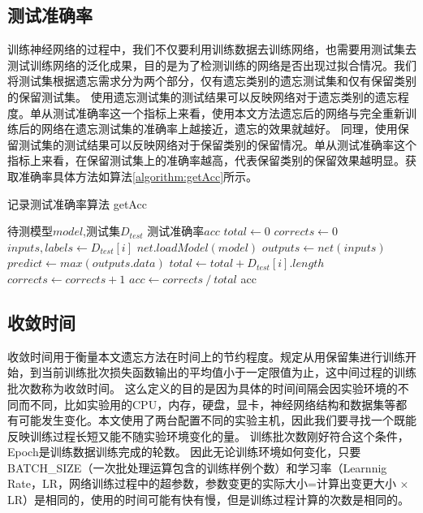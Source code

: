 \subsection{测试准确率}
训练神经网络的过程中，我们不仅要利用训练数据去训练网络，也需要用测试集去测试训练网络的泛化成果，目的是为了检测训练的网络是否出现过拟合情况。我们将测试集根据遗忘需求分为两个部分，仅有遗忘类别的遗忘测试集和仅有保留类别的保留测试集。
使用遗忘测试集的测试结果可以反映网络对于遗忘类别的遗忘程度。单从测试准确率这一个指标上来看，使用本文方法遗忘后的网络与完全重新训练后的网络在遗忘测试集的准确率上越接近，遗忘的效果就越好。
同理，使用保留测试集的测试结果可以反映网络对于保留类别的保留情况。单从测试准确率这个指标上来看，在保留测试集上的准确率越高，代表保留类别的保留效果越明显。获取准确率具体方法如算法\ref{algorithm:getAcc}所示。
\begin{algorithm}
	\renewcommand{\algorithmicrequire}{\textbf{Input:}}
	\renewcommand{\algorithmicensure}{\textbf{Output:}}
	\caption{记录测试准确率算法  getAcc}
	\label{algorithm:getAcc}
	\begin{algorithmic}[1]
        \REQUIRE 待测模型$model$,测试集$D_{test}$
        \ENSURE  测试准确率$acc$
        \STATE $total \gets 0$
        \STATE $corrects \gets 0$
            \STATE $inputs, labels \gets D_{test}[i]$
            \STATE $net.loadModel(model)$
            \STATE $outputs \gets net(inputs)$
            \STATE $predict \gets max(outputs.data)$
            \STATE $total \gets total + D_{test}[i].length$
                    \STATE $corrects \gets corrects + 1$
                \ENDIF
            \ENDFOR
        \ENDFOR
        \STATE $acc \gets corrects {\ } / {\ } total$
        \RETURN acc
	\end{algorithmic}  
\end{algorithm}

\subsection{收敛时间}
收敛时间用于衡量本文遗忘方法在时间上的节约程度。规定从用保留集进行训练开始，到当前训练批次损失函数输出的平均值小于一定限值为止，这中间过程的训练批次数称为收敛时间。
这么定义的目的是因为具体的时间间隔会因实验环境的不同而不同，比如实验用的CPU，内存，硬盘，显卡，神经网络结构和数据集等都有可能发生变化。本文使用了两台配置不同的实验主机，因此我们要寻找一个既能反映训练过程长短又能不随实验环境变化的量。
训练批次数刚好符合这个条件，Epoch是训练数据训练完成的轮数。
因此无论训练环境如何变化，只要BATCH\_SIZE（一次批处理运算包含的训练样例个数）和学习率（Learnnig Rate，LR，网络训练过程中的超参数，参数变更的实际大小=计算出变更大小 $\times$ LR）是相同的，使用的时间可能有快有慢，但是训练过程计算的次数是相同的。

